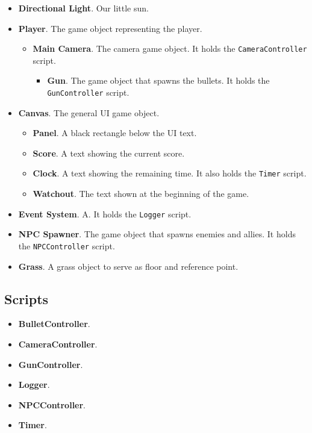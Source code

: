 \documentclass[
	emulatestandardclasses, %
	11pt,
	a4paper,
	toc=bib, %
	parskip=half-,
	numbers=endperiod,
]{scrartcl}
\begin{document}
\begin{itemize}
	\item \textbf{Directional Light}. Our little sun.
	\item \textbf{Player}. The game object representing the player.
	\begin{itemize}
		\item \textbf{Main Camera}. The camera game object. It holds the \texttt{CameraController} script.
		\begin{itemize}
			\item \textbf{Gun}. The game object that spawns the bullets. It holds the \texttt{GunController} script.
		\end{itemize}
	\end{itemize}
	\item \textbf{Canvas}. The general UI game object.
	\begin{itemize}
		\item \textbf{Panel}. A black rectangle below the UI text.
		\item \textbf{Score}. A text showing the current score.
		\item \textbf{Clock}. A text showing the remaining time. It also holds the \texttt{Timer} script.
		\item \textbf{Watchout}. The text shown at the beginning of the game.
	\end{itemize}
	\item \textbf{Event System}. A. It holds the \texttt{Logger} script.
	\item \textbf{NPC Spawner}. The game object that spawns enemies and allies. It holds the \texttt{NPCController} script.
	\item \textbf{Grass}. A grass object to serve as floor and reference point.
\end{itemize}

\subsection{Scripts}

\begin{itemize}
	\item \textbf{BulletController}.
	\item \textbf{CameraController}.
	\item \textbf{GunController}.
	\item \textbf{Logger}.
	\item \textbf{NPCController}.
	\item \textbf{Timer}.
\end{itemize}
\end{document}
